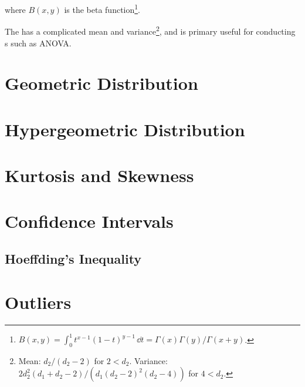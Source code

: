 \noindent where $B\left(x,y\right)$ is the beta function\footnote{$B\left(x,y\right) = \int_{0}^{1} t^{x-1} \left(1-t\right)^{y-1} \, \dd{t} = \Gamma\left(x\right)\Gamma\left(y\right) / \Gamma\left(x+y\right)$.}.

The \Fdist has a complicated
mean and variance\footnote{Mean: $d_{2}/\left(d_{2}-2\right)$ for $2 < d_{2}$.
Variance: $2 d_{2}^{2}\left(d_{1}+d_{2}-2\right)/\left(d_{1}\left(d_{2}-2\right)^{2}\left(d_{2}-4\right)\right)$ for $4 < d_{2}$.},
and is primary useful for conducting {\Ftest}s such as ANOVA.

\section{Geometric Distribution}
\label{stats:geo_dist}

\section{Hypergeometric Distribution}
\label{stats:hypergeo_dist}

\section{Kurtosis and Skewness}
\label{stats:kurtosis_skewness}

\section{Confidence Intervals}
\label{stats:CI}

\subsection{Hoeffding's Inequality}
\label{stats:CI:hoeffding}

\section{Outliers}
\label{stats:outliers}

